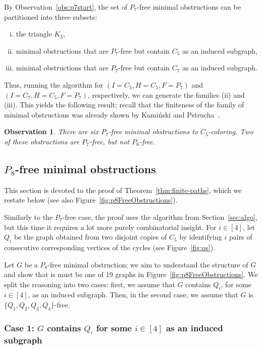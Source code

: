 \documentclass[11pt,a4paper]{article}
\theoremstyle{mystyle}
\newtheorem{observation}[theorem]{Observation}
\begin{document}
By Observation~\ref{obs:p7start}, the set of $P_7$-free minimal obstructions can be partitioned into three subsets:
\begin{enumerate}[(i)]
    \item the triangle $K_3$,
    \item minimal obstructions that are $P_7$-free but contain $C_5$ as an induced subgraph,
    \item minimal obstructions that are $P_7$-free but contain $C_7$ as an induced subgraph.
\end{enumerate}
Thus, running the algorithm for $(I=C_5,H=C_5,F=P_7)$ and $(I=C_7,H=C_5,F=P_7)$, respectively, we can generate the families (ii) and (iii). This yields the following result; recall that the finiteness of the family of minimal obstructions was already shown by Kamiński and Pstrucha~\cite{DBLP:journals/dam/KaminskiP19}.

\begin{observation}
There are six $P_7$-free minimal obstructions to $C_5$-coloring.
Two of these obstructions are $P_7$-free, but not $P_6$-free.
\end{observation}

\subsection{$P_8$-free minimal obstructions}

This section is devoted to the proof of Theorem~\ref{thm:finite-paths}, which we restate below (see also Figure~\ref{fig:p8FreeObstructions}).

\thmfinitepaths*

Similarly to the $P_7$-free case, the proof uses the algorithm from Section~\ref{sec:algo},
but this time it requires a lot more purely combinatorial insight.
For $i \in [4]$, let $Q_i$ be the graph obtained from two disjoint copies of $C_5$ by identifying $i$ pairs of consecutive corresponding vertices of the cycles (see Figure~\ref{fig:qs}).



Let $G$ be a $P_8$-free minimal obstruction; we aim to understand the structure of $G$ and show that is must be one of 19 graphs in Figure~\ref{fig:p8FreeObstructions}.
We split the reasoning into two cases: first, we assume that $G$ contains $Q_i$, for some $i \in [4]$, as an induced subgraph.
Then, in the second case, we assume that $G$ is $\{Q_1,Q_2,Q_3,Q_4\}$-free.


\subsubsection*{Case 1: $G$ contains $Q_i$ for some $i \in [4]$ as an induced subgraph}
\end{document}
